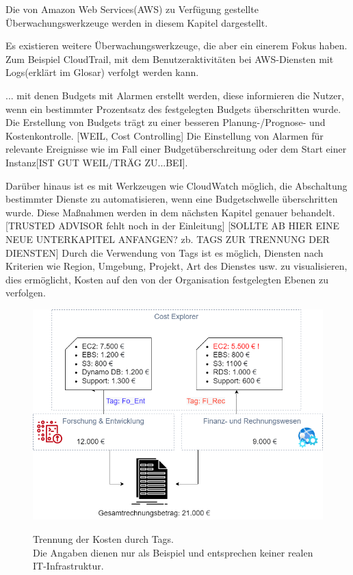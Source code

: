 Die von Amazon Web Services(AWS) zu Verfügung gestellte Überwachungswerkzeuge werden in diesem Kapitel dargestellt.

 


Es existieren weitere Überwachungswerkzeuge, die aber ein einerem Fokus haben. Zum Beispiel CloudTrail, mit dem Benutzeraktivitäten bei AWS-Diensten mit Logs(erklärt im Glosar) verfolgt werden kann.%




... mit denen Budgets mit Alarmen erstellt werden, diese informieren die Nutzer, wenn ein bestimmter Prozentsatz des festgelegten Budgets überschritten wurde. Die Erstellung von Budgets trägt zu einer besseren Planung-/Prognose- und Kostenkontrolle. [WEIL, Cost Controlling]
Die Einstellung von Alarmen für relevante Ereignisse wie im Fall einer Budgetüberschreitung oder dem Start einer Instanz[IST GUT WEIL/TRÄG ZU...BEI].

Darüber hinaus ist es mit Werkzeugen wie CloudWatch möglich, die Abschaltung bestimmter Dienste zu automatisieren, wenn eine Budgetschwelle überschritten wurde. Diese Maßnahmen werden in dem nächsten Kapitel genauer behandelt.
[TRUSTED ADVISOR fehlt noch in der Einleitung]
[SOLLTE AB HIER EINE NEUE UNTERKAPITEL ANFANGEN? zb. TAGS ZUR TRENNUNG DER DIENSTEN]
Durch die Verwendung von Tags ist es möglich, Diensten nach Kriterien wie Region, Umgebung, Projekt, Art des Dienstes usw. zu visualisieren, dies %
ermöglicht, Kosten auf den von der Organisation festgelegten Ebenen zu verfolgen.

\begin{figure}[h!]
  \centering
  \includegraphics[scale=0.4]{sources/Kosten_Ueber_Abteilungen}
  \caption[Trennung der Kosten durch Tags]{}
  \label{fig:Kosten_Ueber_Abteilungen} 
  Trennung der Kosten durch Tags.\\
  Die Angaben dienen nur als Beispiel und entsprechen keiner realen IT-Infrastruktur.
\end{figure}

